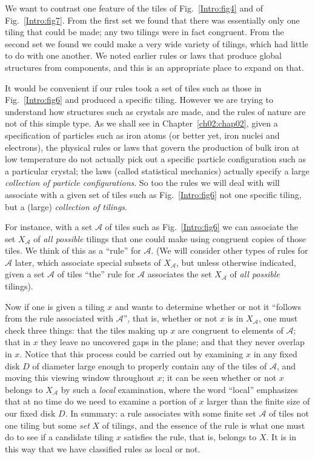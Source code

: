 \documentclass[reqno]{stml-l}
\theoremstyle{plain}
\theoremstyle{definition}
\numberwithin{equation}{chapter}
\begin{document}
We want to contrast one feature of the tiles of
Fig.~\ref{Intro:fig4} and of Fig.~\ref{Intro:fig7}. From
the first set we found that there was essentially only one
tiling that could be made; any two tilings were in fact
congruent. From the second set we found we could make a
very wide variety of tilings, which had little to do with
one another. We noted earlier rules or laws that produce
global structures from components, and this is an
appropriate place to expand on that.

It would be convenient if our rules took a set of tiles
such as those in Fig.~\ref{Intro:fig6} and produced a
specific tiling. However we are trying to understand how
structures such as crystals are made, and the rules of
nature are not of this simple type. As we shall see in
Chapter~\ref{ch02:chap02}, given a specification of
particles such as iron atoms (or better yet, iron nuclei
and electrons), the physical rules or laws that govern the
production of bulk iron at low temperature do not actually
pick out a specific particle configuration such as a
particular crystal; the laws (called statistical mechanics)
actually specify a large \emph{collection of particle
configurations}. So too the rules we will deal with will
associate with a given set of tiles such as
Fig.~\ref{Intro:fig6} not one specific tiling, but a
(large) \emph{collection of tilings}.

For instance, with a set $\mathcal{A}$ of tiles such as
Fig.~\ref{Intro:fig6} we can associate the set
$X_{\mathcal{A}}$ of \emph{all
possible} tilings that one could make using congruent
copies of those tiles. We think of this as a ``rule'' for
$\mathcal{A}$. (We will consider other types of rules for
$\mathcal{A}$ later, which associate special subsets of
$X_{\mathcal{A}}$, but unless otherwise indicated, given a
set $\mathcal{A}$ of tiles ``the'' rule for $\mathcal{A}$
associates the set $X_{\mathcal{A}}$ of \emph{all possible}
tilings).

Now if one is given a tiling $x$ and wants to determine
whether or not it ``follows from the rule associated with
$\mathcal{A}$'', that is, whether or not $x$ is in
$X_{\mathcal{A}}$, one must check three things: that the
tiles making up $x$ are congruent to elements of
$\mathcal{A}$; that in $x$ they leave no uncovered gaps in
the plane; and that they never overlap in $x$. Notice that
this process could be carried out by examining $x$ in any
fixed disk $D$ of diameter large enough to properly contain
any of the tiles of $\mathcal{A}$, and moving this viewing
window throughout $x$; it can be seen whether or not $x$
belongs to $X_{\mathcal{A}}$ by such a
\emph{local} examination, where the
word ``local'' emphasizes that at no time do we need to
examine a portion of $x$ larger than the finite size of our
fixed disk $D$. In summary: a rule associates with some
finite set $\mathcal{A}$ of tiles not one tiling but some
\emph{set} $X$ of tilings, and the essence of the rule is
what one must do to see if a candidate tiling $x$ satisfies
the rule, that is, belongs to $X$. It is in this way that
we have classified rules as local or not.
\end{document}
